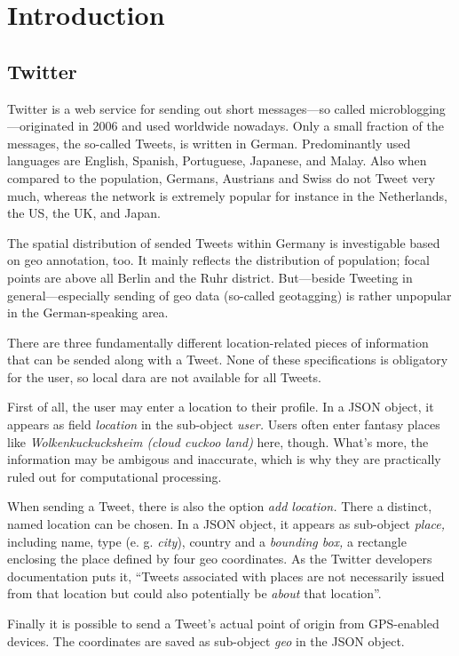 \documentclass[./Main.tex]{subfiles}
\begin{document}
\section{Introduction}
\subsection{Twitter}
Twitter is a web service for sending out short messages---so called microblogging---originated in 2006 and used worldwide nowadays. Only a small fraction of the messages, the so-called Tweets, is written in German. Predominantly used languages are English, Spanish, Portuguese, Japanese, and Malay.\cite{TwLang} Also when compared to the population, Germans, Austrians and Swiss do not Tweet very much, whereas the network is extremely popular for instance in the Netherlands, the US, the UK, and Japan.\cite{TwCountries}

The spatial distribution of sended Tweets within Germany is investigable based on geo annotation, too. It mainly reflects the distribution of population; focal points are above all Berlin and the Ruhr district. But---beside Tweeting in general---especially sending of geo data (so-called geotagging) is rather unpopular in the German-speaking area.

There are three fundamentally different location-related pieces of information that can be sended along with a Tweet. None of these specifications is obligatory for the user, so local dara are not available for all Tweets.

First of all, the user may enter a location to their profile. In a JSON object, it appears as field \textit{location} in the sub-object \textit{user.} Users often enter fantasy places like \textit{Wolkenkuckucksheim (cloud cuckoo land)} here, though. What's more, the information may be ambigous and inaccurate, which is why they are practically ruled out for computational processing.

When sending a Tweet, there is also the option \textit{add location.} There a distinct, named location can be chosen. In a JSON object, it appears as sub-object \textit{place,} including name, type (e. g. \textit{city}), country and a \textit{bounding box,} a rectangle enclosing the place defined by four geo coordinates. As the Twitter developers documentation puts it, ``Tweets associated with places are not necessarily issued from that location but could also potentially be \textit{about} that location''. 

Finally it is possible to send a Tweet's actual point of origin from GPS-enabled devices. The coordinates are saved as sub-object \textit{geo} in the JSON object.
\end{document}
